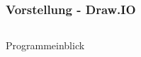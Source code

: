 \documentclass[xcolor=dvipsnames]{beamer}
\begin{document}
\begin{frame}
	\frametitle{Vorstellung  - Draw.IO}
	\begin{columns}
		
		\begin{column}{0.35\textwidth}
			\begin{block}{Programmeinblick}
				
				
			\end{block}
		\end{column}
		
		
		\begin{column}{0.75\textwidth}
			\begin{minipage}{\textwidth}
				
				
			\end{minipage}
		\end{column}
		
	\end{columns}
\end{frame}
\end{document}

